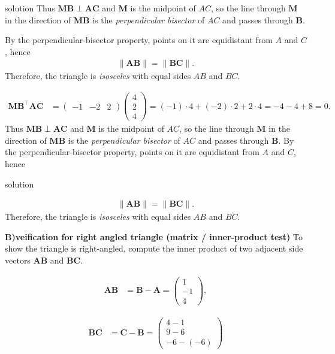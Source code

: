 \documentclass{beamer}
\numberwithin{equation}{section}
\theoremstyle{remark}
\newcommand{\myvec}[1]{\ensuremath{\begin{pmatrix}#1\end{pmatrix}}}
\let\vec\mathbf
\begin{document}
\begin{frame}{solution}
Thus $\vec{MB}\perp \vec{AC}$ and $\vec{M}$ is the midpoint of $AC$, so the line through $\vec{M}$ in the direction of $\vec{MB}$ is the \emph{perpendicular bisector} of $AC$ and passes through $\vec{B}$.

By the perpendicular-bisector property, points on it are equidistant from $A$ and $C$, hence
\begin{align}
\|\vec{AB}\|=\|\vec{BC}\|.
\end{align}
Therefore, the triangle is \emph{isosceles} with equal sides $AB$ and $BC$.


\begin{align}
\vec{MB}^\top \vec{AC}
&= \myvec{-1 & -2 & 2}\myvec{4\\2\\4}
= (-1)\cdot 4 + (-2)\cdot 2 + 2\cdot 4
= -4 -4 + 8
= 0.
\end{align}
Thus $\vec{MB}\perp \vec{AC}$ and $\vec{M}$ is the midpoint of $AC$, so the line through $\vec{M}$ in the direction of $\vec{MB}$ is the \emph{perpendicular bisector} of $AC$ and passes through $\vec{B}$.
By the perpendicular-bisector property, points on it are equidistant from $A$ and $C$, hence
\end{frame}
\begin{frame}{solution}

\begin{align}
\|\vec{AB}\|=\|\vec{BC}\|.
\end{align}
Therefore, the triangle is \emph{isosceles} with equal sides $AB$ and $BC$.

\textbf{ B)veification for right angled triangle (matrix / inner-product test)}
To show the triangle is right-angled, compute the inner product of two adjacent side vectors $\vec{AB}$ and $\vec{BC}$.

\begin{align}
\vec{AB} &= \vec{B}-\vec{A} = \myvec{1\\-1\\4},
\end{align}

\begin{align}
\vec{BC} &= \vec{C}-\vec{B} = \myvec{4-1\\[4pt]9-6\\[4pt]-6-(-6)}
\end{align}
\end{frame}
\end{document}
